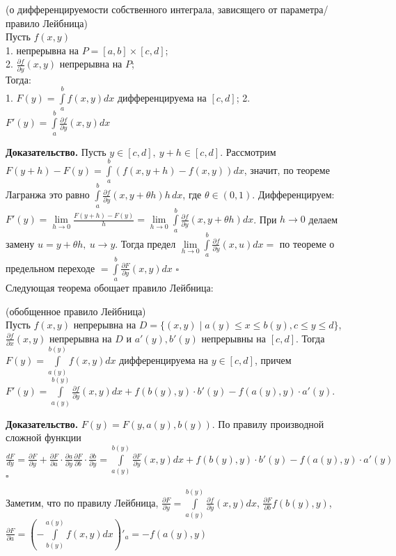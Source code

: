 \begin{theor}
    (о дифференцируемости собственного интеграла, зависящего от параметра/
    правило Лейбница)\\
    Пусть $f(x,y)$ \\
    1. непрерывна на  $P=[a,b]\times[c,d]$;\\
    2. $\frac{\partial f}{\partial y}(x,y)$ непрерывна на $P$;\\
    Тогда:\\
    1. $F(y)=\int\limits_{a}^{b} f(x,y)dx$ дифференцируема на $[c,d]$;
    2. $F'(y)=\int\limits_{a}^{b}\frac{\partial f}{\partial y}(x,y)dx$
\end{theor}
\textbf{Доказательство.} Пусть $y\in[c,d],~y+h\in[c,d]$. 
Рассмотрим  $F(y+h)-F(y)=\int\limits_{a}^{b} (f(x,y+h)-f(x,y))dx$, 
значит, по теореме Лагранжа это равно $\int\limits_{a}^{b}
\frac{\partial f}{\partial y}(x,y+\theta h)h\,dx$, где $\theta\in(0,1)$. 
Дифференцируем:
$F'(y)=\lim\limits_{h \to 0}\frac{F(y+h)-F(y)}{h}=\lim\limits_{h \to 0}
\int\limits_{a}^{b} \frac{\partial f}{\partial y}(x,y+\theta h)dx$.
При $h\to 0$ делаем замену  $u=y+\theta h,~u\to y$. Тогда предел
 $\lim\limits_{h \to 0}
\int\limits_{a}^{b} \frac{\partial f}{\partial y}(x,u)dx=$
по теореме о предельном переходе $=\int\limits_{a}^{b}
\frac{\partial F}{\partial y}(x,y)dx$ $\square$ \\
Следующая теорема обощает правило Лейбница:
\begin{theor} (обобщенное правило Лейбница)\\
    Пусть $f(x,y)$ непрерывна на  $D=\{(x,y)\mid a(y)\leqslant x\leqslant 
    b(y),c\leqslant y\leqslant d\}$, $\frac{\partial f}{\partial x}(x,y)$ 
    непрерывна на $D$ и $a'(y),b'(y)$ непрерывны на  $[c,d]$. Тогда
     $F(y)=\int\limits_{a(y)}^{b(y)}f(x,y)dx$ дифференцируема на 
     $y\in[c,d]$, причем  $F'(y)=\int\limits_{a(y)}^{b(y)} 
     \frac{\partial f}{\partial y} (x,y)dx+f(b(y),y)\cdot b'(y)-
     f(a(y),y)\cdot a'(y)$.
\end{theor}
\textbf{Доказательство.}  $F(y)=F(y,a(y),b(y))$. По правилу производной
сложной функции  $\frac{dF}{dy}=\frac{\partial F}{\partial y}+
\frac{\partial F}{\partial a}\cdot \frac{\partial a}{\partial y} 
\frac{\partial F}{\partial b}\cdot \frac{\partial b}{\partial y}=
\int\limits_{a(y)}^{b(y)}\frac{\partial F}{\partial y}(x,y)dx
+f(b(y),y)\cdot b'(y)-f(a(y),y)\cdot a'(y)$ $\square$

Заметим, что по правилу Лейбница, $\frac{\partial F}{\partial y}=
\int\limits_{a(y)}^{b(y)} \frac{\partial f}{\partial y}(x,y)dx$,
$\frac{\partial F}{\partial b} f(b(y),y)$,
$\frac{\partial F}{\partial a}=
\left(-\int\limits_{b(y)}^{a(y)}f(x,y)dx\right)'_a=-f(a(y),y)$

